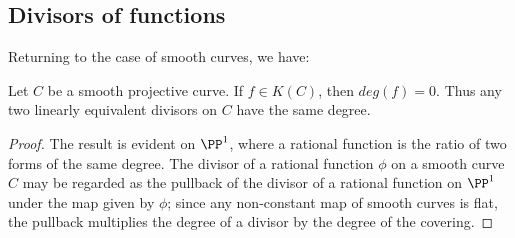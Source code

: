  
%
%
%

\subsection{Divisors of functions}
Returning to the case of smooth curves, we have:
\begin{theorem}\label{degree defn}
Let $C$ be a smooth projective curve. If $f\in K(C)$, then $deg (f) = 0$. Thus any two linearly equivalent divisors on $C$ have the
same degree.
\end{theorem}

\begin{proof}
 The result is evident on $\PP^1$, where a rational 
function is the ratio of two forms of the same degree. The divisor of a rational function $\phi$ on a smooth curve $C$ may be regarded as the pullback of the divisor of a rational function
on $\PP^1$ under the map given by $\phi$; since any non-constant map of smooth curves is flat, the pullback multiplies the degree of a divisor by the degree 
of the covering. 
\end{proof}

